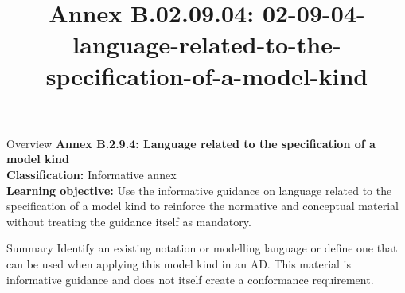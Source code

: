 \documentclass[10pt,letterpaper]{article}
\title{Annex B.02.09.04: 02-09-04-language-related-to-the-specification-of-a-model-kind}
\author{}
\date{}
\begin{document}
\maketitle
\begin{CornellOverviewBox}{Overview}
{\Large\bfseries\textcolor{CNavy}{Annex B.2.9.4: Language related to the specification of a model kind}}\\[3pt]
{\small\textbf{Classification:} Informative annex}\\
{\small\textbf{Learning objective:} Use the informative guidance on language related to the specification of a model kind to reinforce the normative and conceptual material without treating the guidance itself as mandatory.}
\end{CornellOverviewBox}
\vspace{3pt}

\begin{CornellNotesTable}
\end{CornellNotesTable}


\begin{CornellSummaryBox}{Summary}
Identify an existing notation or modelling language or define one that can be used when applying this model kind in an AD. This material is informative guidance and does not itself create a conformance requirement.
\end{CornellSummaryBox}
\end{document}
